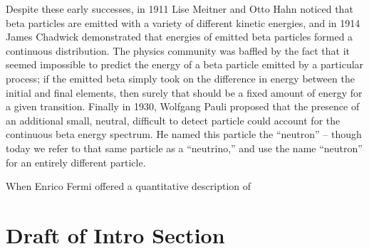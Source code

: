 Despite these early successes, in 1911 Lise Meitner and Otto Hahn noticed that beta particles are emitted with a variety of different kinetic energies, and in 1914 James Chadwick demonstrated that energies of emitted beta particles formed a continuous distribution.  The physics community was baffled by the fact that it seemed impossible to predict the energy of a beta particle emitted by a particular process;  if the emitted beta simply took on the difference in energy between the initial and final elements, then surely that should be a fixed amount of energy for a given transition.  Finally in 1930, Wolfgang Pauli proposed that the presence of an additional small, neutral, difficult to detect particle could account for the continuous beta energy spectrum.  He named this particle the ``neutron'' -- though today we refer to that same particle as a ``neutrino,'' and use the name ``neutron'' for an entirely different particle.


When Enrico Fermi offered a quantitative description of 



\section{Draft of Intro Section}
